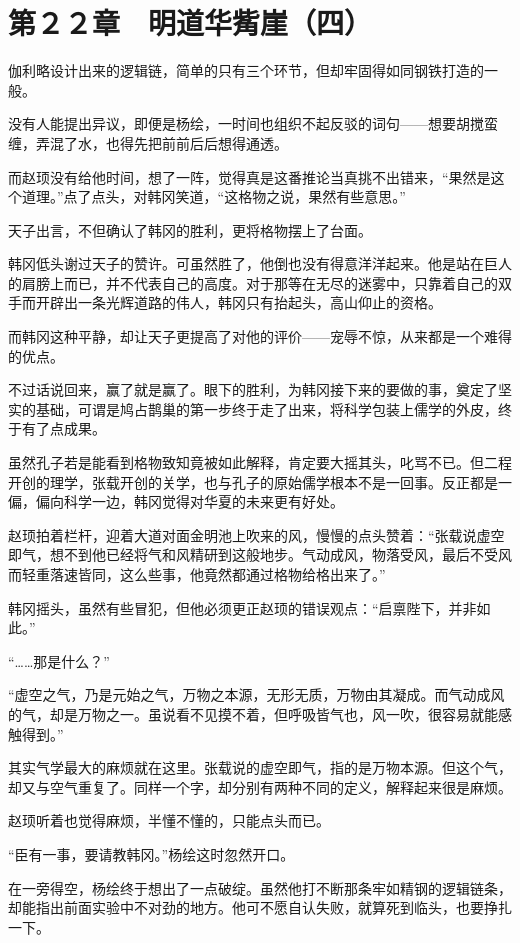 \section{第２２章　明道华觜崖（四）}

伽利略设计出来的逻辑链，简单的只有三个环节，但却牢固得如同钢铁打造的一般。

没有人能提出异议，即便是杨绘，一时间也组织不起反驳的词句——想要胡搅蛮缠，弄混了水，也得先把前前后后想得通透。

而赵顼没有给他时间，想了一阵，觉得真是这番推论当真挑不出错来，“果然是这个道理。”点了点头，对韩冈笑道，“这格物之说，果然有些意思。”

天子出言，不但确认了韩冈的胜利，更将格物摆上了台面。

韩冈低头谢过天子的赞许。可虽然胜了，他倒也没有得意洋洋起来。他是站在巨人的肩膀上而已，并不代表自己的高度。对于那等在无尽的迷雾中，只靠着自己的双手而开辟出一条光辉道路的伟人，韩冈只有抬起头，高山仰止的资格。

而韩冈这种平静，却让天子更提高了对他的评价——宠辱不惊，从来都是一个难得的优点。

不过话说回来，赢了就是赢了。眼下的胜利，为韩冈接下来的要做的事，奠定了坚实的基础，可谓是鸠占鹊巢的第一步终于走了出来，将科学包装上儒学的外皮，终于有了点成果。

虽然孔子若是能看到格物致知竟被如此解释，肯定要大摇其头，叱骂不已。但二程开创的理学，张载开创的关学，也与孔子的原始儒学根本不是一回事。反正都是一偏，偏向科学一边，韩冈觉得对华夏的未来更有好处。

赵顼拍着栏杆，迎着大道对面金明池上吹来的风，慢慢的点头赞着：“张载说虚空即气，想不到他已经将气和风精研到这般地步。气动成风，物落受风，最后不受风而轻重落速皆同，这么些事，他竟然都通过格物给格出来了。”

韩冈摇头，虽然有些冒犯，但他必须更正赵顼的错误观点：“启禀陛下，并非如此。”

“……那是什么？”

“虚空之气，乃是元始之气，万物之本源，无形无质，万物由其凝成。而气动成风的气，却是万物之一。虽说看不见摸不着，但呼吸皆气也，风一吹，很容易就能感触得到。”

其实气学最大的麻烦就在这里。张载说的虚空即气，指的是万物本源。但这个气，却又与空气重复了。同样一个字，却分别有两种不同的定义，解释起来很是麻烦。

赵顼听着也觉得麻烦，半懂不懂的，只能点头而已。

“臣有一事，要请教韩冈。”杨绘这时忽然开口。

在一旁得空，杨绘终于想出了一点破绽。虽然他打不断那条牢如精钢的逻辑链条，却能指出前面实验中不对劲的地方。他可不愿自认失败，就算死到临头，也要挣扎一下。

